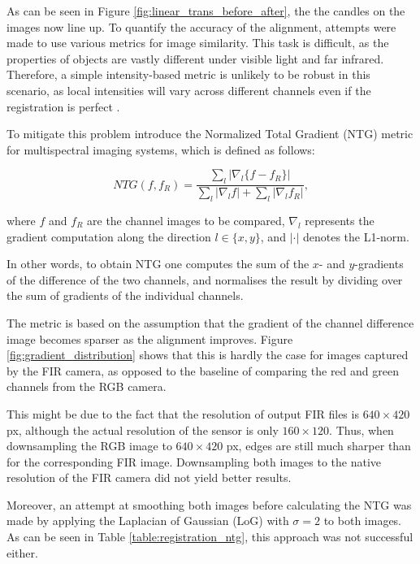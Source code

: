 \documentclass{l4proj}
\begin{document}
As can be seen in Figure \ref{fig:linear_trans_before_after}, the the candles on the images now line up. To quantify the accuracy of the alignment, attempts were made to use various metrics for image similarity. This task is difficult, as the properties of objects are vastly different under visible light and far infrared. Therefore, a simple intensity-based metric is unlikely to be robust in this scenario, as local intensities will vary across different channels even if the registration is perfect \citep{myronenko_intensity-based_2010}.

To mitigate this problem \citet{chen_normalized_2018} introduce the Normalized Total Gradient (NTG) metric for multispectral imaging systems, which is defined as follows:

\begin{equation}
  NTG(f, f_R) = \frac{\sum_l |\nabla_l \{f - f_R\}|}{\sum_l | \nabla_l f | + \sum_l | \nabla_l f_R|},
\end{equation}

where $f$ and $f_R$ are the channel images to be compared, $\nabla_l$ represents the gradient computation along the direction $l \in \{x, y\}$, and $| \cdot |$ denotes the L1-norm.

In other words, to obtain NTG one computes the sum of the $x$- and $y$-gradients of the difference of the two channels, and normalises the result by dividing over the sum of gradients of the individual channels.

The metric is based on the assumption that the gradient of the channel difference image becomes sparser as the alignment improves. Figure \ref{fig:gradient_distribution} shows that this is hardly the case for images captured by the FIR camera, as opposed to the baseline of comparing the red and green channels from the RGB camera.

This might be due to the fact that the resolution of output FIR files is $640 \times 420$ px, although the actual resolution of the sensor is only $160 \times 120$. Thus, when downsampling the RGB image to $640 \times 420$ px, edges are still much sharper than for the corresponding FIR image. Downsampling both images to the native resolution of the FIR camera did not yield better results.

Moreover, an attempt at smoothing both images before calculating the NTG was made by applying the Laplacian of Gaussian (LoG) with $\sigma=2$ to both images. As can be seen in Table \ref{table:registration_ntg}, this approach was not successful either. 
\end{document}
